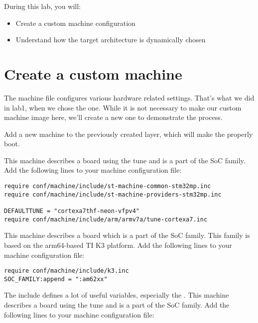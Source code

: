 
During this lab, you will:
\begin{itemize}
  \item Create a custom machine configuration
  \item Understand how the target architecture is dynamically chosen
\end{itemize}

\section{Create a custom machine}

The machine file configures various hardware related settings. That's
what we did in lab1, when we chose the 
{} {} one.
While it is not necessary to make our custom machine image here, we'll create a
new one to demonstrate the process.

Add a new  machine to the previously created layer, which
will make the
properly boot.

\if{}
This machine describes a board using the 
tune and is a part of the  SoC family. Add the following
lines to your machine configuration file:

\begin{verbatim}
require conf/machine/include/st-machine-common-stm32mp.inc
require conf/machine/include/st-machine-providers-stm32mp.inc

DEFAULTTUNE = "cortexa7thf-neon-vfpv4"
require conf/machine/include/arm/armv7a/tune-cortexa7.inc
\end{verbatim}
\else
  \if{}
This machine describes a board which is a part of the  SoC family.
This family is based on the arm64-based TI K3 platform.
Add the following lines to your machine configuration file:

\begin{verbatim}
require conf/machine/include/k3.inc
SOC_FAMILY:append = ":am62xx"
\end{verbatim}

The  include defines a lot of useful variables, especially
the .
  \else
This machine describes a board using the  tune
and is a part of the  SoC family. Add the following lines
to your machine configuration file:

